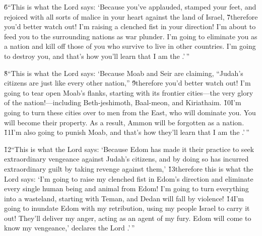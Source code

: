 \v{6}``This is what the Lord  says: `Because you've applauded, stamped your feet, and rejoiced with all sorts of malice in your heart against the land of Israel, \v{7}therefore you'd better watch out! I'm raising a clenched fist in your direction! I'm about to feed you to the surrounding nations as war plunder. I'm going to eliminate you as a nation and kill off those of you who survive to live in other countries. I'm going to destroy you, and that's how you'll learn that I am the .'\,''

\v{8}``This is what the Lord  says: `Because Moab and Seir are claiming, ``Judah's citizens are just like every other nation,'' \v{9}therefore you'd better watch out! I'm going to tear open Moab's flanks, starting with its frontier cities---the very glory of the nation!---including Beth-jeshimoth, Baal-meon, and Kiriathaim. \v{10}I'm going to turn these cities over to men from the East, who will dominate you. You will become their property. As a result, Ammon will be forgotten as a nation. \v{11}I'm also going to punish Moab, and that's how they'll learn that I am the .'\,''

\v{12}``This is what the Lord  says: `Because Edom has made it their practice to seek extraordinary vengeance against Judah's citizens, and by doing so has incurred extraordinary guilt by taking revenge against them,' \v{13}therefore this is what the Lord  says: `I'm going to raise my clenched fist in Edom's direction and eliminate every single human being and animal from Edom! I'm going to turn everything into a wasteland, starting with Teman, and Dedan will fall by violence! \v{14}I'm going to inundate Edom with my retribution, using my people Israel to carry it out! They'll deliver my anger, acting as an agent of my fury. Edom will come to know my vengeance,' declares the Lord .'\,''

